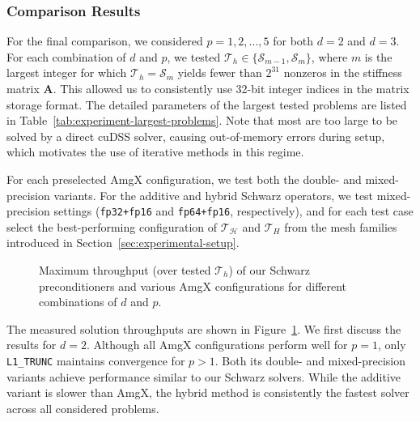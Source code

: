 \documentclass[11pt]{article}
\theoremstyle{definition}
\theoremstyle{theorem}
\begin{document}
\subsubsection{Comparison Results}
\label{sec:amgx-comparison-results}

For the final comparison, we considered $p=1,2,...,5$ for both $d=2$ and $d=3$.
For each combination of $d$ and $p$, we tested $\mathcal{T}_h\in \{\mathcal{S}_{m-1}, \mathcal{S}_m\}$,
where $m$ is the largest integer for which $\mathcal{T}_h=\mathcal{S}_m$ yields fewer than
$2^{31}$ nonzeros in the stiffness matrix $\bm{A}$. This allowed us to consistently
use 32-bit integer indices in the matrix storage format.
The detailed parameters of the largest tested problems are listed in
Table~\ref{tab:experiment-largest-problems}. Note that most
are too large to be solved by a direct cuDSS solver, causing out-of-memory errors
during setup, which motivates the use of iterative methods in this regime.

\begin{table}
  \centering
  \caption{Parameters of the largest problems tested for each combination of $d$ and $p$.}
  \label{tab:experiment-largest-problems}
  
\end{table}

For each preselected AmgX configuration, we test both the double- and
mixed-precision variants. For the additive and hybrid Schwarz operators, we test
mixed-precision settings (\verb|fp32+fp16| and \verb|fp64+fp16|, respectively),
and for each test case select the best-performing configuration of
$\mathcal{T}_\mathcal{H}$ and $\mathcal{T}_H$ from the mesh families introduced in
Section~\ref{sec:experimental-setup}.

\begin{figure}
  \centering
  
  \caption{Maximum throughput (over tested $\mathcal{T}_h$) of our Schwarz
  preconditioners and various AmgX configurations for different combinations of $d$ and $p$.}
  \label{fig:throughput-vs-amgx}
\end{figure}

The measured solution throughputs are shown in Figure~\ref{fig:throughput-vs-amgx}.
We first discuss the results for $d=2$. Although all AmgX configurations
perform well for $p=1$, only \verb|L1_TRUNC| maintains convergence for $p>1$.
Both its double- and mixed-precision variants achieve performance similar to our
Schwarz solvers. While the additive variant is slower than AmgX, the hybrid method
is consistently the fastest solver across all considered problems.
\end{document}
